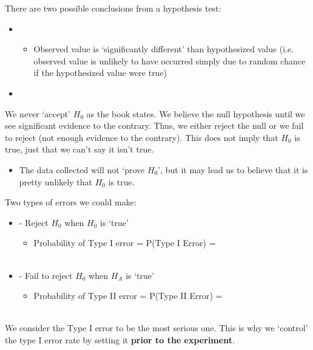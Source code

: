 There are two possible conclusions from a hypothesis test: 
\begin{itemize}
\item ~
\begin{itemize}
\item Observed value is `significantly different' than hypothesized value (i.e. observed value is unlikely to have occurred simply due to random chance if the hypothesized value were true)
\end{itemize}	
\item ~\\
\end{itemize}	

We never `accept' $H_0$ as the book states. We believe the null hypothesis  until we see significant evidence to the contrary.  Thus, we either reject the null or we fail to reject (not enough evidence to the contrary).  This does not imply that $H_0$ is true, just that we can't say it isn't true.
\begin{itemize}
\item The data collected will not `prove $H_0$', but it may lead us to believe that it is pretty unlikely that $H_0$ is true.\\
\end{itemize}

Two types of errors we could make:\\
\begin{itemize}
\item \underbar{~~~~~~~~~~~~~~~~~~~~~~~~~~~~~~~~~~~~~~~~~~} - Reject $H_0$ when $H_0$ is `true'\\
\begin{itemize}
\item Probability of Type I error = P(Type I Error) = \\~\\
\end{itemize}
\item \underbar{~~~~~~~~~~~~~~~~~~~~~~~~~~~~~~~~~~~~~~~~~~} - Fail to reject $H_0$ when $H_A$ is `true'
\begin{itemize}
\item Probability of Type II error = P(Type II Error) = \\~\\
\end{itemize}
\end{itemize}

We consider the Type I error to be the most serious one.  This is why we `control' the type I error rate by setting it \textbf{prior to the experiment}.\\~\\

